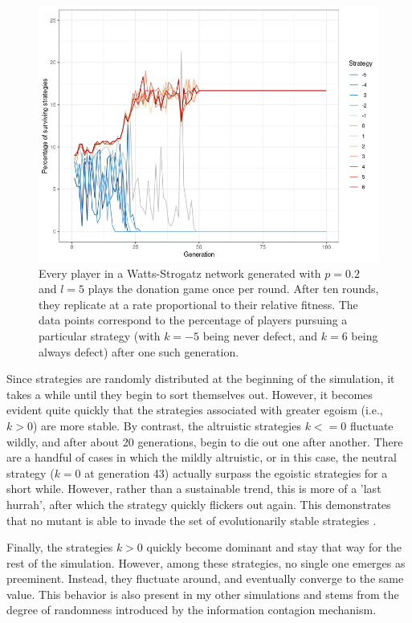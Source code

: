 \documentclass{JASSS}
\begin{document}
\begin{figure}
	\centering
	\includegraphics[width=\linewidth]{./figures/results_WS_N300_p02.png}
	\caption{Every player in a Watts-Strogatz network generated with $p=0.2$ and $l=5$ plays the donation game once per round. After ten rounds, they replicate at a rate proportional to their relative fitness. The data points correspond to the percentage of players pursuing a particular strategy (with $k=-5$ being never defect, and $k=6$ being always defect) after one such generation.}
	\label{WS_300_p_02}
\end{figure}

Since strategies are randomly distributed at the beginning of the simulation, it takes a while until they begin to sort themselves out. However, it becomes evident quite quickly that the strategies associated with greater egoism (i.e., $k>0$) are more stable. By contrast, the altruistic strategies $k<=0$ fluctuate wildly, and after about 20 generations, begin to die out one after another. There are a handful of cases in which the mildly altruistic, or in this case, the neutral strategy ($k=0$ at generation 43) actually surpass the egoistic strategies for a short while. However, rather than a sustainable trend, this is more of a 'last hurrah', after which the strategy quickly flickers out again. This demonstrates that no mutant is able to invade the set of evolutionarily stable strategies \citep{hamilton1964_2}.

Finally, the strategies $k>0$ quickly become dominant and stay that way for the rest of the simulation. However, among these strategies, no single one emerges as preeminent. Instead, they fluctuate around, and eventually converge to the same value. This behavior is also present in my other simulations and stems from the degree of randomness introduced by the information contagion mechanism.
\end{document}
